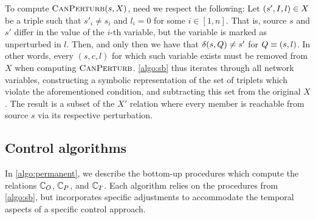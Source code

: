 To compute $\textsc{CanPerturb}(s, X)$, need we respect the following: Let $(s', I, l) \in X$ be a triple such that $s'_i \not= s_i$ and $l_i = 0$ for some $i \in [1,n]$. That is, source $s$ and $s'$ differ in the value of the $i$-th variable, but the variable is marked as unperturbed in $l$. Then, and only then we have that $\delta(s, Q) \not= s'$ for $Q \equiv (s, l)$. In other words, every $(s, c, l)$ for which such variable exists must be removed from $X$ when computing $\textsc{CanPerturb}$. \autoref{algo:sb} thus iterates through all network variables, constructing a symbolic representation of the set of triplets which violate the aforementioned condition, and subtracting this set from the original $X$. The result is a subset of the $X'$ relation where every member is reachable from source $s$ via its respective perturbation.

\subsection{Control algorithms}
\label{ss:control_algos_st_otp}

In \autoref{algo:permanent},  we describe the bottom-up procedures which compute the relations $\mathbb{C}_O$, $\mathbb{C}_P$, and $\mathbb{C}_T$. Each algorithm relies on the procedures from \autoref{algo:sb}, but incorporates specific adjustments to accommodate the temporal aspects of a specific control approach.

\begin{algorithm}
  \caption{Control procedures.}
  \label{algo:permanent}
\end{algorithm}  

